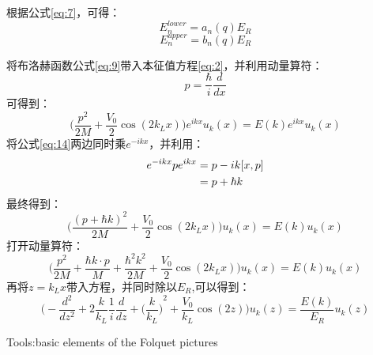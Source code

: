 \documentclass{article}
\begin{document}
	根据公式\ref{eq:7}，可得：
	\begin{equation}
		E_n^{lower}=a_n(q)E_R \label{eq:11}
	\end{equation}
	\begin{equation}
		E_n^{upper}=b_n(q)E_R
	\end{equation}
	
	将布洛赫函数公式\ref{eq:9}带入本征值方程\ref{eq:2}，并利用动量算符：
	\begin{equation}
		p=\frac{\hbar}{i}\frac{d}{dx} \label{eq:13}
	\end{equation}
	可得到：
	\begin{equation}
		\bigg(\frac{p^2}{2M}+\frac{V_0}{2}\cos(2k_Lx)\bigg)e^{ikx}u_k(x)=E(k)e^{ikx}u_k(x)  \label{eq:14}
	\end{equation}
	将公式\ref{eq:14}两边同时乘$e^{-ikx}$，并利用：
	\begin{align}
		e^{-ikx}pe^{ikx} &=p-ik[x,p] \notag \\
		&=p+\hbar k \label{eq:15}
	\end{align}	
	最终得到：
	\begin{equation}
		\bigg(\frac{(p+\hbar k)^2}{2M}+\frac{V_0}{2}\cos(2k_Lx)\bigg)u_k(x)=E(k)u_k(x) \label{eq:16}
	\end{equation}
	打开动量算符：
	\begin{equation}
		\bigg(\frac{p^2}{2M}+\frac{\hbar k\cdot p}{M}+\frac{\hbar^2k^2}{2M}+\frac{V_0}{2}\cos(2k_Lx)\bigg)u_k(x)=E(k)u_k(x) \label{eq:17}
	\end{equation}
	再将$z=k_Lx$带入方程，并同时除以$E_R$,可以得到：
	\begin{equation}
		\bigg(-\frac{d^2}{dz^2}+2\frac{k}{k_L}\frac{1}{i}\frac{d}{dz}+{\bigg(\frac{k}{k_L}\bigg)}^2+\frac{V_0}{k_L}\cos(2z)\bigg)u_k(z)=\frac{E(k)}{E_R}u_k(z) \label{eq:18}
	\end{equation}
	
	
	Tools:basic elements of the Folquet pictures
	
\end{document}
